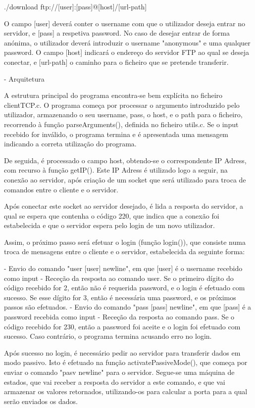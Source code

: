 \documentclass[article, a4paper, 11pt, oneside]{memoir}
\begin{document}
./download ftp://[user]:[pass]@[host]/[url-path]

O campo [user] deverá conter o username com que o utilizador deseja entrar no servidor, e [pass] a respetiva password.
No caso de desejar entrar de forma anónima, o utilizador deverá introduzir o username "anonymous" e uma qualquer password.
O campo [host] indicará o endereço do servidor FTP ao qual se deseja conectar, e [url-path] o caminho para o ficheiro que se pretende transferir.

- Arquitetura

A estrutura principal do programa encontra-se bem explícita no ficheiro clientTCP.c.
O programa começa por processar o argumento introduzido pelo utilizador, armazenando o seu username,
pass, o host, e o path para o ficheiro, recorrendo à função parseArguments(), definida no ficheiro utils.c. 
Se o input recebido for inválido, o programa termina e é apresentada uma mensagem indicando a correta utilização do programa.

De seguida, é processado o campo host, obtendo-se o correspondente IP Adress, com recurso à função getIP().
Este IP Adress é utilizado logo a seguir, na conexão ao servidor, após criação de um socket que será utilizado
para troca de comandos entre o cliente e o servidor.

Após conectar este socket ao servidor desejado, é lida a resposta do servidor, a qual se espera que contenha o código 220,
que indica que a conexão foi estabelecida e que o servidor espera pelo login de um novo utilizador. 

Assim, o próximo passo será efetuar o login (função login()), que consiste numa troca de mensagens entre o cliente e o servidor,
estabelecida da seguinte forma:

  - Envio do comando "user [user] newline", em que [user] é o username recebido como input
  - Receção da resposta ao comando user. Se o primeiro dígito do código recebido for 2, então não é requerida password, e o login é efetuado com sucesso. Se esse dígito for 3, então é necessária uma password, e os próximos passos são efetuados.
  - Envio do comando "pass [pass] newline", em que [pass] é a password recebida como input
  - Receção da resposta ao comando pass. Se o código recebido for 230, então a password foi aceite e o login foi efetuado com sucesso. Caso contrário, o programa termina acusando erro no login.

Após sucesso no login, é necessário pedir ao servidor para transferir dados em modo passivo. Isto é efetuado na função activatePassiveMode(), que começa por enviar o comando "pasv newline" para o servidor.
Segue-se uma máquina de estados, que vai receber a resposta do servidor a este comando, e que vai armazenar os valores retornados, utilizando-os para calcular a porta para a qual serão enviados os dados. 
\end{document}
